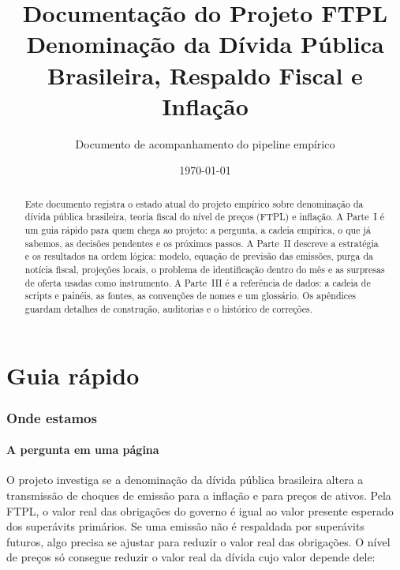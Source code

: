 \documentclass[12pt,a4paper]{article}
\title{\textbf{Documentação do Projeto FTPL}\\
\large Denominação da Dívida Pública Brasileira, Respaldo Fiscal e Inflação}
\author{Documento de acompanhamento do pipeline empírico}
\date{\today}
\begin{document}
\maketitle

\begin{abstract}
Este documento registra o estado atual do projeto empírico sobre denominação da
dívida pública brasileira, teoria fiscal do nível de preços (FTPL) e inflação. A
Parte~I é um guia rápido para quem chega ao projeto: a pergunta, a cadeia empírica,
o que já sabemos, as decisões pendentes e os próximos passos. A Parte~II descreve a
estratégia e os resultados na ordem lógica: modelo, equação de previsão das
emissões, purga da notícia fiscal, projeções locais, o problema de identificação
dentro do mês e as surpresas de oferta usadas como instrumento. A Parte~III é a
referência de dados: a cadeia de scripts e painéis, as fontes, as convenções de
nomes e um glossário. Os apêndices guardam detalhes de construção, auditorias e o
histórico de correções.
\end{abstract}

\newpage

\tableofcontents

\newpage

\part{Guia rápido}

\section{Onde estamos}\label{sec:guia}

\subsection{A pergunta em uma página}

O projeto investiga se a denominação da dívida pública brasileira altera a
transmissão de choques de emissão para a inflação e para preços de ativos. Pela
FTPL, o valor real das obrigações do governo é igual ao valor presente esperado dos
superávits primários. Se uma emissão não é respaldada por superávits futuros, algo
precisa se ajustar para reduzir o valor real das obrigações. O nível de preços só
consegue reduzir o valor real da dívida cujo valor depende dele:
\end{document}
